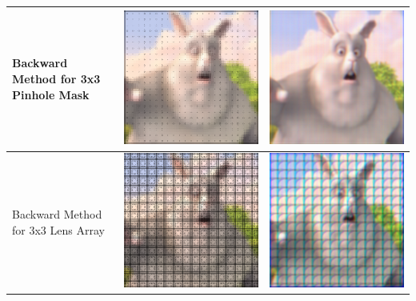 \begin{table}[]
\begin{tabular}{| p{5 cm} | p{4cm} | p{4cm}  |}
    \hline Backward Method for 3x3 Pinhole Mask & \includegraphics[width = 4 cm]{chapters/chapter9/images/simulation_backward/pinhole/prefilterResult_3x3_pinhole_depth9.png} &
        \includegraphics[width = 4 cm]{chapters/chapter9/images/simulation_backward/pinhole/simulationResult_3x3_pinhole_depth9.png} \\
   \hline Backward Method for 3x3 Lens Array & \includegraphics[width = 4 cm]{chapters/chapter9/images/simulation_backward/lens/prefilterResult_3x3_lens_depth6.png} &
        \includegraphics[width = 4 cm]{chapters/chapter9/images/simulation_backward/lens/simulationResult_3x3_lens_depth6.png} \\ \hline
  \end{tabular}
\end{table}

